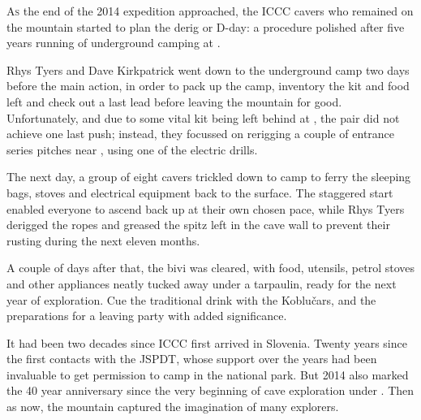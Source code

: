 \thispagestyle{endchapter}

\begin{tcolorbox}
\vspace{80pt}

	\lettrine{A}{s} the end of the 2014 expedition approached, the ICCC cavers who remained on the mountain started to plan the derig or D-day: a procedure polished after five years running of underground camping at . 

	Rhys Tyers and Dave Kirkpatrick went down to the underground camp two days before the main action, in order to pack up the camp, inventory the kit and food left and check out a last lead before leaving the mountain for good. Unfortunately, and due to some vital kit being left behind at , the pair did not achieve one last push; instead, they focussed on rerigging a couple of entrance series pitches near , using one of the electric drills. 

	The next day, a group of eight cavers trickled down to camp  to ferry the sleeping bags, stoves and electrical equipment back to the surface. The staggered start enabled everyone to ascend back up at their own chosen pace, while Rhys Tyers derigged the ropes and greased the spitz left in the cave wall to prevent their rusting during the next eleven months.

	A couple of days after that, the bivi was cleared, with food, utensils, petrol stoves and other appliances neatly tucked away under a tarpaulin, ready for the next year of exploration. Cue the traditional drink with the Koblu\v{c}ars, and the preparations for a leaving party with added significance.

	It had been two decades since ICCC first arrived in Slovenia. Twenty years since the first contacts with the JSPDT, whose support over the years had been invaluable to get permission to camp in the national park. But 2014 also marked the  40 year anniversary since the very beginning of cave exploration under . Then as now, the mountain captured the imagination of many explorers.

	

\end{tcolorbox}
